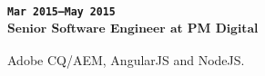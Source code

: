\subsubsection{
\textsubscript{
\uppercase{\texttt{Mar 2015--May 2015}}\\
Senior Software Engineer at PM Digital
}
}
Adobe CQ/AEM, AngularJS and NodeJS.
